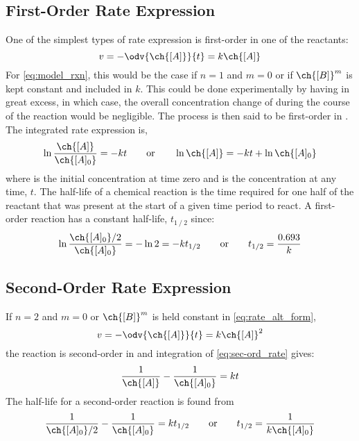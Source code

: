 \subsection{First-Order Rate Expression}
\label{subs:first-order_rate_expr}
One of the simplest types of rate expression is first-order in one of the reactants:
\begin{equation}
	v = -\odv{\ch{[A]}}{t} = k \ch{[A]}
	\label{eq:first-ord_rate}
\end{equation}
For \cref{eq:model_rxn}, this would be the case if \(n = 1\) and \(m = 0\) or if \(\ch{[B]}^m\) is kept constant and included in \(k\). 
This could be done experimentally by having  in great excess, in which case, the overall concentration change of  during the course of the reaction would be negligible. The process is then said to be first-order in . 
The integrated rate expression is,
\begin{equation}
	\ln{\frac{\ch{[A]}}{\ch{[A]_0}}} = -k t \qquad \text{or} \qquad \ln{\ch{[A]}} = -k t + \ln{\ch{[A]_0}}
	\label{eq:fo_int_rate}
\end{equation}
where  is the initial concentration  at time zero and \ch{[A]} is the concentration at any time, \(t\). 
The half-life of a chemical reaction is the time required for one half of the reactant that was present at the start of a given time period to react. 
A first-order reaction has a constant half-life, \(t_{1⁄2}\) since:
\begin{equation}
	\ln{\frac{\ch{[A]_{0}}/2}{\ch{[A]_{0}}}} = - \ln{2} = - k t_{1/2} \qquad \text{or} \qquad t_{1/2} = \frac{0.693}{k}
	\label{eq:fo_half_life}
\end{equation}

\subsection{Second-Order Rate Expression}
\label{subs:second-order_rate_expr}

If \(n=2\) and \(m=0\) or \(\ch{[B]}^m\) is held constant in \cref{eq:rate_alt_form}, 
\begin{equation}
	v = -\odv{\ch{[A]}}{t} = k \ch{[A]}^2
	\label{eq:sec-ord_rate}
\end{equation}
the reaction is second-order in  and integration of \cref{eq:sec-ord_rate} gives:
\begin{equation}
	\frac{1}{\ch{[A]}} - \frac{1}{\ch{[A]_0}} = k t
	\label{eq:so_int_rate}
\end{equation}
The half-life for a second-order reaction is found from 
\begin{equation}
	\frac{1}{\ch{[A]_0}/2} - \frac{1}{\ch{[A]_0}} = k t_{1/2} \qquad \text{or} \qquad t_{1/2} = \frac{1}{k \ch{[A]_0}}
	\label{eq:so_half_life}
\end{equation}

